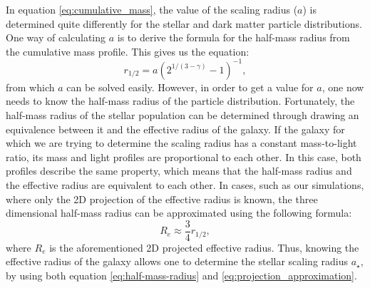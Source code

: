 \documentclass[english, oneside]{HYgradu}
\begin{document}
In equation \ref{eq:cumulative_mass}, the value of the scaling radius ($a$) is determined quite differently for the stellar and dark matter particle distributions. One way of calculating $a$ is to derive the formula for the half-mass radius from the cumulative mass profile. This gives us the equation:
\begin{equation}
r_{1/2} = a \left( 2^{1/(3-\gamma)}-1 \right)^{-1}, \label{eq:half-mass-radius}
\end{equation}
from which $a$ can be solved easily. However, in order to get a value for $a$, one now needs to know the half-mass radius of the particle distribution. Fortunately, the half-mass radius of the stellar population can be determined through drawing an equivalence between it and the effective radius of the galaxy. If the galaxy for which we are trying to determine the scaling radius has a constant mass-to-light ratio, its mass and light profiles are proportional to each other. In this case, both profiles describe the same property, which means that the half-mass radius and the effective radius are equivalent to each other. In cases, such as our simulations, where only the 2D projection of the effective radius is known, the three dimensional half-mass radius can be approximated using the following formula:
\begin{equation}
R_e \approx \frac{3}{4} r_{1/2}, \label{eq:projection_approximation}
\end{equation} 
where $R_e$ is the aforementioned 2D projected effective radius. Thus, knowing the effective radius of the galaxy allows one to determine the stellar scaling radius $a_\star$, by using both equation \ref{eq:half-mass-radius} and \ref{eq:projection_approximation}.
\end{document}
